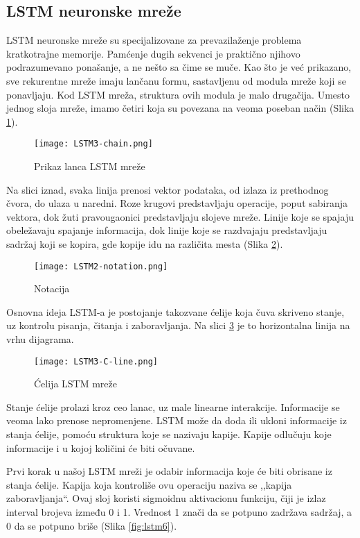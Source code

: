 \documentclass[a4paper]{article}
\begin{document}
\subsection{LSTM neuronske mreže}

LSTM neuronske mreže su specijalizovane za prevazilaženje problema kratkotrajne memorije. Pamćenje dugih sekvenci je praktično njihovo podrazumevano ponašanje, a ne nešto sa čime se muče. Kao što je već prikazano, sve rekurentne mreže imaju lančanu formu, sastavljenu od modula mreže koji se ponavljaju. Kod LSTM mreža, struktura ovih modula je malo drugačija. Umesto jednog sloja mreže, imamo četiri koja su povezana na veoma poseban način (Slika \ref{fig:lstm3}).

\begin{figure}[htp]
    \centering
    \texttt{[image: LSTM3-chain.png]}
    \caption{Prikaz lanca LSTM mreže}
    \label{fig:lstm3}
\end{figure}

Na slici iznad, svaka linija prenosi vektor podataka, od izlaza iz prethodnog čvora, do ulaza u naredni. Roze krugovi predstavljaju operacije, poput sabiranja vektora, dok žuti pravougaonici predstavljaju slojeve mreže. Linije koje se spajaju obeležavaju spajanje informacija, dok linije koje se razdvajaju predstavljaju sadržaj koji se kopira, gde kopije idu na različita mesta (Slika \ref{fig:lstm4}).

\begin{figure}[htp]
    \centering
    \texttt{[image: LSTM2-notation.png]}
    \caption{Notacija}
    \label{fig:lstm4}
\end{figure}

Osnovna ideja LSTM-a je postojanje takozvane ćelije koja čuva skriveno stanje, uz kontrolu pisanja, čitanja i zaboravljanja. Na slici \ref{fig:lstm5} je to horizontalna linija na vrhu dijagrama.

\begin{figure}[htp]
    \centering
    \texttt{[image: LSTM3-C-line.png]}
    \caption{Ćelija LSTM mreže}
    \label{fig:lstm5}
\end{figure}


Stanje ćelije prolazi kroz ceo lanac, uz male linearne interakcije. Informacije se veoma lako prenose nepromenjene. LSTM može da doda ili ukloni informacije iz stanja ćelije, pomoću struktura koje se nazivaju kapije. Kapije odlučuju koje informacije i u kojoj količini će biti očuvane. 

Prvi korak u našoj LSTM mreži je odabir informacija koje će biti obrisane iz stanja ćelije. Kapija koja kontroliše ovu operaciju naziva se ,,kapija zaboravljanja``. Ovaj sloj koristi sigmoidnu aktivacionu funkciju, čiji je izlaz interval brojeva između 0 i 1. Vrednost 1 znači da se potpuno zadržava sadržaj, a 0 da se potpuno briše (Slika \ref{fig:lstm6}).
\end{document}
